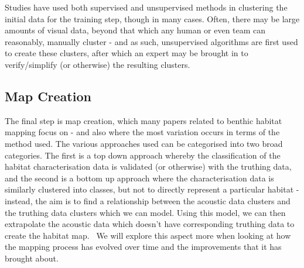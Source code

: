 \documentclass[12pt]{article}
\begin{document}
            Studies have used both supervised and unsupervised methods in clustering the initial data for the training step, though in many cases. Often, there may be large amounts of visual data, beyond that which any human or even team can reasonably, manually cluster - and as such, unsupervised algorithms are first used to create these clusters, after which an expert may be brought in to verify/simplify (or otherwise) the resulting clusters.~\citep*{steinberg11} 

            \subsection{Map Creation}
            The final step is map creation, which many papers related to benthic habitat mapping focus on - and also where the most variation occurs in terms of the method used. The various approaches used can be categorised into two broad categories. The first is a top down approach whereby the classification of the habitat characterisation data is validated (or otherwise) with the truthing data, and the second is a bottom up approach where the characterisation data is similarly clustered into classes, but not to directly represent a particular habitat - instead, the aim is to find a relationship between the acoustic data clusters and the truthing data clusters which we can model. Using this model, we can then extrapolate the acoustic data which doesn't have corresponding truthing data to create the habitat map.~\citep*{ahsan11} We will explore this aspect more when looking at how the mapping process has evolved over time and the improvements that it has brought about.

\end{document}
